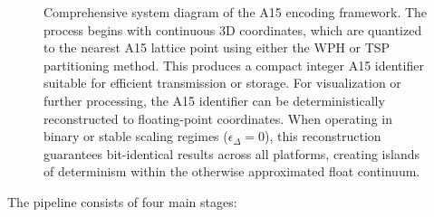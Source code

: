\documentclass[10pt]{article}
\begin{document}
\begin{figure}[!ht]
    \caption{Comprehensive system diagram of the A15 encoding framework. The process begins with continuous 3D coordinates, which are quantized to the nearest A15 lattice point using either the WPH or TSP partitioning method. This produces a compact integer A15 identifier suitable for efficient transmission or storage. For visualization or further processing, the A15 identifier can be deterministically reconstructed to floating-point coordinates. When operating in binary or stable scaling regimes ($\epsilon_\Delta = 0$), this reconstruction guarantees bit-identical results across all platforms, creating islands of determinism within the otherwise approximated float continuum.}
    \label{fig-system-diagram}
\end{figure}

The pipeline consists of four main stages:
\end{document}
